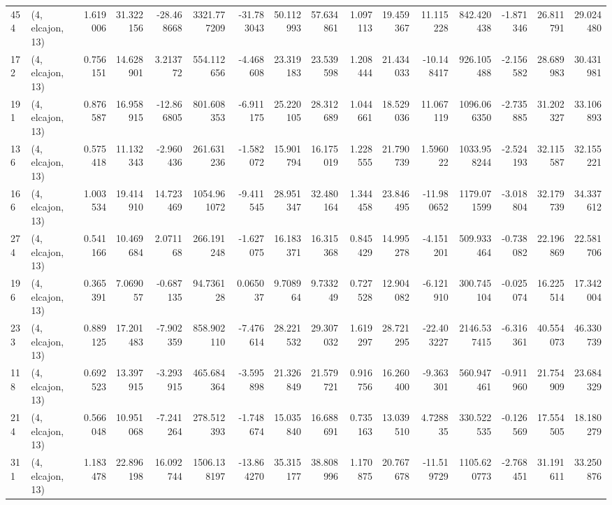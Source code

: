 \begin{tabular}{llrrrrrrrrrrrrrr}
454 &  (4, elcajon, 13) &   1.619006 &  31.322156 & -28.468668 &  3321.777209 & -31.783043 &  50.112993 &  57.634861 &  1.097113 &  19.459367 &  11.115228 &    842.420438 &  -1.871346 &   26.811791 &   29.024480 \\
172 &  (4, elcajon, 13) &   0.756151 &  14.628901 &   3.213772 &   554.112656 &  -4.468608 &  23.319183 &  23.539598 &  1.208444 &  21.434033 & -10.148417 &    926.105488 &  -2.156582 &   28.689983 &   30.431981 \\
191 &  (4, elcajon, 13) &   0.876587 &  16.958915 & -12.866805 &   801.608353 &  -6.911175 &  25.220105 &  28.312689 &  1.044661 &  18.529036 &  11.067119 &   1096.066350 &  -2.735885 &   31.202327 &   33.106893 \\
136 &  (4, elcajon, 13) &   0.575418 &  11.132343 &  -2.960436 &   261.631236 &  -1.582072 &  15.901794 &  16.175019 &  1.228555 &  21.790739 &   1.596022 &   1033.958244 &  -2.524193 &   32.115587 &   32.155221 \\
166 &  (4, elcajon, 13) &   1.003534 &  19.414910 &  14.723469 &  1054.961072 &  -9.411545 &  28.951347 &  32.480164 &  1.344458 &  23.846495 & -11.980652 &   1179.071599 &  -3.018804 &   32.179739 &   34.337612 \\
274 &  (4, elcajon, 13) &   0.541166 &  10.469684 &   2.071168 &   266.191248 &  -1.627075 &  16.183371 &  16.315368 &  0.845429 &  14.995278 &  -4.151201 &    509.933464 &  -0.738082 &   22.196869 &   22.581706 \\
196 &  (4, elcajon, 13) &   0.365391 &   7.069057 &  -0.687135 &    94.736128 &   0.065037 &   9.708964 &   9.733249 &  0.727528 &  12.904082 &  -6.121910 &    300.745104 &  -0.025074 &   16.225514 &   17.342004 \\
233 &  (4, elcajon, 13) &   0.889125 &  17.201483 &  -7.902359 &   858.902110 &  -7.476614 &  28.221532 &  29.307032 &  1.619297 &  28.721295 & -22.403227 &   2146.537415 &  -6.316361 &   40.554073 &   46.330739 \\
118 &  (4, elcajon, 13) &   0.692523 &  13.397915 &  -3.293915 &   465.684364 &  -3.595898 &  21.326849 &  21.579721 &  0.916756 &  16.260400 &  -9.363301 &    560.947461 &  -0.911960 &   21.754909 &   23.684329 \\
214 &  (4, elcajon, 13) &   0.566048 &  10.951068 &  -7.241264 &   278.512393 &  -1.748674 &  15.035840 &  16.688691 &  0.735163 &  13.039510 &   4.728835 &    330.522535 &  -0.126569 &   17.554505 &   18.180279 \\
311 &  (4, elcajon, 13) &   1.183478 &  22.896198 &  16.092744 &  1506.138197 & -13.864270 &  35.315177 &  38.808996 &  1.170875 &  20.767678 & -11.519729 &   1105.620773 &  -2.768451 &   31.191611 &   33.250876 \\

\end{tabular}
